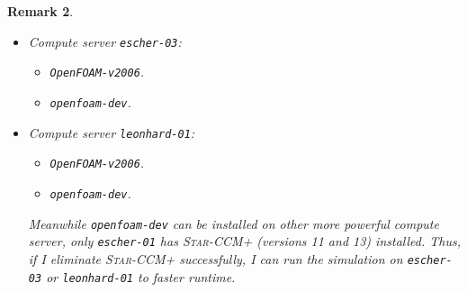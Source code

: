 \documentclass[onsided]{book}
\numberwithin{equation}{section}
\newtheorem{remark}{Remark}[section]
\begin{document}
\begin{enumerate}
\begin{remark}
\begin{itemize}
\begin{itemize}
                \begin{remark}
                    Due to old version of \texttt{gcc, make}, and \texttt{cmake} on \texttt{escher-01},
                    \begin{verbatim}
nguyen@escher-01:~> gcc -v
Using built-in specs.
COLLECT_GCC=gcc
COLLECT_LTO_WRAPPER=/usr/lib64/gcc/x86_64-suse-linux/4.8/lto-wrapper
Target: x86_64-suse-linux
...
Thread model: posix
gcc version 4.8.5 (SUSE Linux)

nguyen@escher-01:~> make -v
GNU Make 4.0
Built for x86_64-unknown-linux-gnu
Copyright (C) 1988-2013 Free Software Foundation, Inc.
License GPLv3+: GNU GPL version 3 or later <http://gnu.org/licenses/gpl.html>
This is free software: you are free to change and redistribute it.
There is NO WARRANTY, to the extent permitted by law.

nguyen@escher-01:~> cmake --version
     cmake version 3.5.2
     
CMake suite maintained and supported by Kitware (kitware.com/cmake).                 
                    \end{verbatim}
                    I cannot install \texttt{openfoam-dev} on \texttt{escher-01}: it requires the newer version of \texttt{gcc, make}, and \texttt{cmake}.
                \end{remark}
            \end{itemize}
            \item Compute server \texttt{escher-03}:
            \begin{itemize}
                \item \texttt{OpenFOAM-v2006}.
                \item \texttt{openfoam-dev}.
            \end{itemize}
            \item Compute server \texttt{leonhard-01}:
            \begin{itemize}
                \item \texttt{OpenFOAM-v2006}.
                \item \texttt{openfoam-dev}.
            \end{itemize}
            Meanwhile \texttt{openfoam-dev} can be installed on other more powerful compute server, only \texttt{escher-01} has \textsc{Star-CCM+} (versions 11 and 13) installed. Thus, if I eliminate \textsc{Star-CCM+} successfully, I can run the simulation on \texttt{escher-03} or \texttt{leonhard-01} to faster runtime.
        \end{itemize}
    \end{remark}


\end{enumerate}
\end{document}
